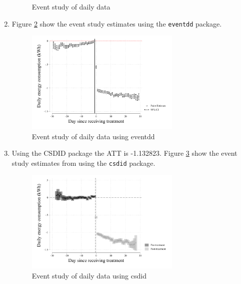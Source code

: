 \documentclass{article}
\begin{document}
\begin{enumerate}
\begin{figure}[H]
        \caption{Event study of daily data}
        \label{f1:event_study} 
        \end{figure}
    \item Figure \ref{f2:event_study_canned} show the event study estimates using the \verb!eventdd! package. 
    \begin{figure}[H]
        \centering
        \includegraphics[width=0.7\textwidth]{./figure/event_study_canned.pdf}
        \caption{Event study of daily data using eventdd}
        \label{f2:event_study_canned} 
        \end{figure}
    \item Using the CSDID package the ATT is -1.132823. Figure \ref{f3:event_study_csdid} show the event study estimates from using the \verb!csdid! package.
    \begin{figure}[H]
        \centering
        \includegraphics[width=0.7\textwidth]{./figure/event_study_csdid.pdf}
        \caption{Event study of daily data using csdid}
        \label{f3:event_study_csdid} 
        \end{figure}
\end{enumerate}
\end{document}
